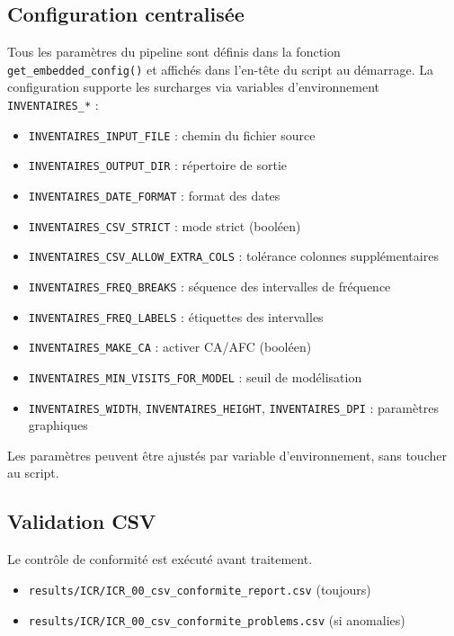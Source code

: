 \documentclass[11pt,a4paper]{article}
\begin{document}
\subsection{Configuration centralisée}
\label{sec:config}

Tous les paramètres du pipeline sont définis dans la fonction \texttt{get\_embedded\_config()} et
affichés dans l'en-tête du script au démarrage. La configuration supporte les surcharges via
variables d'environnement \texttt{INVENTAIRES\_*} :

\begin{itemize}
  \item \texttt{INVENTAIRES\_INPUT\_FILE} : chemin du fichier source
  \item \texttt{INVENTAIRES\_OUTPUT\_DIR} : répertoire de sortie
  \item \texttt{INVENTAIRES\_DATE\_FORMAT} : format des dates
  \item \texttt{INVENTAIRES\_CSV\_STRICT} : mode strict (booléen)
  \item \texttt{INVENTAIRES\_CSV\_ALLOW\_EXTRA\_COLS} : tolérance colonnes supplémentaires
  \item \texttt{INVENTAIRES\_FREQ\_BREAKS} : séquence des intervalles de fréquence
  \item \texttt{INVENTAIRES\_FREQ\_LABELS} : étiquettes des intervalles
  \item \texttt{INVENTAIRES\_MAKE\_CA} : activer CA/AFC (booléen)
  \item \texttt{INVENTAIRES\_MIN\_VISITS\_FOR\_MODEL} : seuil de modélisation
  \item \texttt{INVENTAIRES\_WIDTH}, \texttt{INVENTAIRES\_HEIGHT}, \texttt{INVENTAIRES\_DPI} : paramètres graphiques
\end{itemize}

\begin{infobox}
Les paramètres peuvent être ajustés par variable d'environnement, sans toucher au script.
\end{infobox}

\subsection{Validation CSV}

Le contrôle de conformité est exécuté avant traitement.
\begin{itemize}
  \item \texttt{results/ICR/ICR\_00\_csv\_conformite\_report.csv} (toujours)
  \item \texttt{results/ICR/ICR\_00\_csv\_conformite\_problems.csv} (si anomalies)
\end{itemize}
\end{document}
